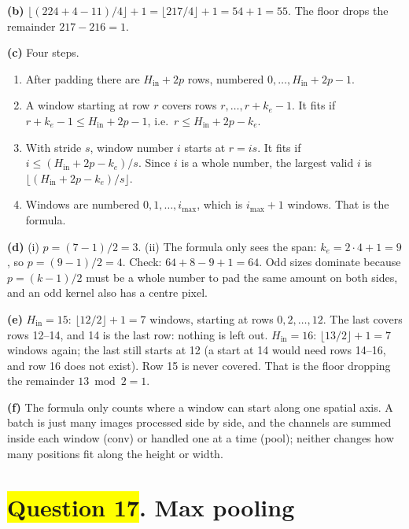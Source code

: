 \documentclass[12pt,a4paper]{article}
\newcommand{\hlq}[1]{{\setlength{\fboxsep}{1.5pt}\colorbox{yellow}{#1}}}
\begin{document}
\textbf{(b)} $\lfloor(224+4-11)/4\rfloor+1=\lfloor217/4\rfloor+1=54+1=55$. The floor drops the remainder $217-216=1$.

\textbf{(c)} Four steps.
\begin{enumerate}[nosep]
\item After padding there are $H_{\text{in}}+2p$ rows, numbered $0,\dots,H_{\text{in}}+2p-1$.
\item A window starting at row $r$ covers rows $r,\dots,r+k_e-1$. It fits if $r+k_e-1\le H_{\text{in}}+2p-1$, i.e.\ $r\le H_{\text{in}}+2p-k_e$.
\item With stride $s$, window number $i$ starts at $r=is$. It fits if $i\le(H_{\text{in}}+2p-k_e)/s$. Since $i$ is a whole number, the largest valid $i$ is $\lfloor(H_{\text{in}}+2p-k_e)/s\rfloor$.
\item Windows are numbered $0,1,\dots,i_{\max}$, which is $i_{\max}+1$ windows. That is the formula.
\end{enumerate}

\textbf{(d)} (i) $p=(7-1)/2=3$. (ii) The formula only sees the span: $k_e=2\cdot4+1=9$, so $p=(9-1)/2=4$. Check: $64+8-9+1=64$. Odd sizes dominate because $p=(k-1)/2$ must be a whole number to pad the same amount on both sides, and an odd kernel also has a centre pixel.

\textbf{(e)} $H_{\text{in}}=15$: $\lfloor12/2\rfloor+1=7$ windows, starting at rows $0,2,\dots,12$. The last covers rows 12--14, and 14 is the last row: nothing is left out. $H_{\text{in}}=16$: $\lfloor13/2\rfloor+1=7$ windows again; the last still starts at 12 (a start at 14 would need rows 14--16, and row 16 does not exist). Row 15 is never covered. That is the floor dropping the remainder $13\bmod2=1$.

\textbf{(f)} The formula only counts where a window can start along one spatial axis. A batch is just many images processed side by side, and the channels are summed inside each window (conv) or handled one at a time (pool); neither changes how many positions fit along the height or width.

\section[Question 17. Max pooling]{\hlq{Question 17}. Max pooling}
\end{document}
